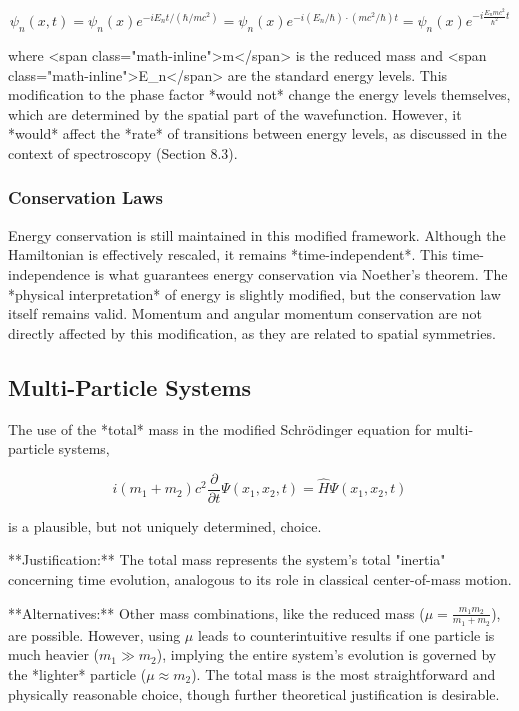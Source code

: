 \documentclass{article}
\begin{document}
{{{{				\begin{equation}
					\psi_n(x,t) = \psi_n(x) e^{-iE_n t / (\hbar/mc^2)} = \psi_n(x)e^{-i(E_n/\hbar) \cdot (mc^2/\hbar)t}=\psi_n(x)e^{-i\frac{E_nmc^2}{\hbar^2}t}
				\end{equation}
				
				where <span class="math-inline">m</span> is the reduced mass and <span class="math-inline">E\_n</span> are the standard energy levels.  This modification to the phase factor *would not* change the energy levels themselves, which are determined by the spatial part of the wavefunction. However, it *would* affect the *rate* of transitions between energy levels, as discussed in the context of spectroscopy (Section 8.3).
				
				\subsubsection{Conservation Laws}
				
				Energy conservation is still maintained in this modified framework. Although the Hamiltonian is effectively rescaled, it remains *time-independent*.  This time-independence is what guarantees energy conservation via Noether's theorem. The *physical interpretation* of energy is slightly modified, but the conservation law itself remains valid. Momentum and angular momentum conservation are not directly affected by this modification, as they are related to spatial symmetries.
				
				\subsection{Multi-Particle Systems}
				
				The use of the *total* mass in the modified Schrödinger equation for multi-particle systems,
				
				\begin{equation}
					i (m_1 + m_2) c^2 \frac{\partial}{\partial t} \Psi(x_1, x_2, t) = \hat{H} \Psi(x_1, x_2, t)
				\end{equation}
				
				is a plausible, but not uniquely determined, choice.
				
				**Justification:** The total mass represents the system's total "inertia" concerning time evolution, analogous to its role in classical center-of-mass motion.
				
				**Alternatives:** Other mass combinations, like the reduced mass ($\mu = \frac{m_1 m_2}{m_1 + m_2}$), are possible. However, using $\mu$ leads to counterintuitive results if one particle is much heavier ($m_1 \gg m_2$), implying the entire system's evolution is governed by the *lighter* particle ($\mu \approx m_2$). The total mass is the most straightforward and physically reasonable choice, though further theoretical justification is desirable.
				
}}}}
\end{document}
